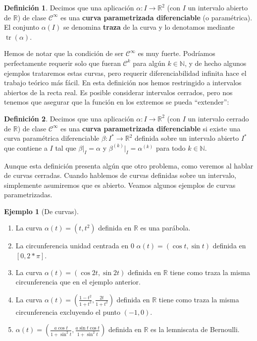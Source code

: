 \documentclass{article}
\theoremstyle{definition}
\newtheorem{define}{Definición}
\newtheorem{ejem}{Ejemplo}
\DeclareMathOperator{\trace}{tr}
\newcommand{\reales}{\mathbb{R}}
\newcommand{\naturales}{\mathbb{N}}
\newcommand{\cinfinito}{\mathcal{C}^{\infty}}
\newcommand{\claseck}[1]{\mathcal{C}^{#1}}
\begin{document}
\begin{define}
	Decimos que una aplicación $\alpha: I \rightarrow \reales^2$ (con $I$ un intervalo abierto de $\reales$) de clase $\cinfinito$ es una \textbf{curva parametrizada diferenciable} (o paramétrica). El conjunto $\alpha(I)$ se denomina \textbf{traza} de la curva y lo denotamos mediante $\trace(\alpha)$.
\end{define}
Hemos de notar que la condición de ser $\cinfinito$ es muy fuerte. Podríamos perfectamente requerir solo que fueran $\claseck{k}$ para algún $k \in \naturales$, y de hecho algunos ejemplos trataremos estas curvas, pero requerir diferenciabilidad infinita hace el trabajo teórico más fácil. En esta definición nos hemos restringido a intervalos abiertos de la recta real. Es posible considerar intervalos cerrados, pero nos tenemos que asegurar que la función en los extremos se pueda ``extender'':
\begin{define}
	Decimos que una aplicación $\alpha: I \rightarrow \reales^2$ (con $I$ un intervalo cerrado de $\reales$) de clase $\cinfinito$ es una \textbf{curva parametrizada diferenciable} si existe una curva paramétrica diferenciable $\beta: I^* \rightarrow \reales^2$ definida sobre un intervalo abierto $I^*$ que contiene a $I$ tal que $\beta  \big|_I = \alpha$ y $\beta^{(k)}  \big|_I = \alpha^{(k)}$ para todo $k \in \naturales$.
\end{define}
Aunque esta definición presenta algún que otro problema, como veremos al hablar de curvas cerradas. Cuando hablemos de curvas definidas sobre un intervalo, simplemente asumiremos que es abierto.
Veamos algunos ejemplos de curvas parametrizadas.
\begin{ejem}[De curvas]
\begin{enumerate}
	\item
	La curva $\alpha (t) = (t, t^2)$ definida en $\reales$ es una parábola. \\ 
	\item 
	La circunferencia unidad centrada en $0$ $\alpha(t) = (\cos t, \sin t)$ definida en $[0, 2*\pi]$. \\ 
	\item
	La curva $\alpha(t) = (\cos 2t, \sin 2t)$ definida en $\reales$ tiene como traza la misma circunferencia que en el ejemplo anterior.
	\item
	La curva $\alpha(t) = (\frac{1-t^2}{1+t^2}, \frac{2t}{1+t^2})$ definida en $\reales$ tiene como traza la misma circunferencia excluyendo el punto $(-1, 0)$.
	\item
	$\alpha(t) = (\frac{a\cos t}{1 + \sin^2 t}, \frac{a\sin t \cos t}{1 + \sin^2 t})$ definida en $\reales$ es la lemniscata de Bernoulli.
\end{enumerate}
\end{ejem}
\end{document}

